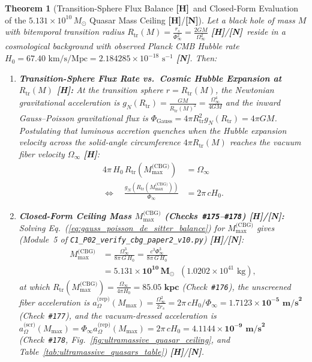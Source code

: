 \documentclass[11pt,a4paper]{article}
\newcommand{\catH}{\textbf{\textcolor{orange!85!black}{[H]}}}
\newcommand{\catN}{\textbf{\textcolor{teal!75!black}{[N]}}}
\theoremstyle{plain}
\newtheorem{theorem}{Theorem}[section]
\theoremstyle{definition}
\theoremstyle{remark}
\numberwithin{equation}{section}
\begin{document}
\begin{theorem}[Transition-Sphere Flux Balance \catH\ and Closed-Form Evaluation of the $5.131 \times 10^{10}\,M_\odot$ Quasar Mass Ceiling \catH/\catN]
\label{prop:quasar_ceiling}
Let a black hole of mass $M$ with bitemporal transition radius $R_{\text{tr}}(M) = \frac{r_s}{\Phi_{\infty}^2} = \frac{2GM}{\Omega_{\infty}^2}$ \catH/\catN\ reside in a cosmological background with observed Planck CMB Hubble rate $H_0 = 67.40\text{ km/s/Mpc} = 2.184285 \times 10^{-18}\text{ s}^{-1}$ \catN. Then:
\begin{enumerate}
  \item[\textnormal{(i)}] \textbf{Transition-Sphere Flux Rate vs.\ Cosmic Hubble Expansion at $R_{\text{tr}}(M)$ \catH:} At the transition sphere $r = R_{\text{tr}}(M)$, the Newtonian gravitational acceleration is $g_N(R_{\text{tr}}) = \frac{GM}{R_{\text{tr}}(M)^2} = \frac{\Omega_{\infty}^4}{4 G M}$ and the inward Gauss--Poisson gravitational flux is $\Phi_{\text{Gauss}} = 4\pi R_{\text{tr}}^2 g_N(R_{\text{tr}}) = 4\pi G M$. Postulating that luminous accretion quenches when the Hubble expansion velocity across the solid-angle circumference $4\pi R_{\text{tr}}(M)$ reaches the vacuum fiber velocity $\Omega_{\infty}$ \catH:
  \begin{align}
    4\pi\,H_0\,R_{\text{tr}}\!\left(M_{\max}^{\text{(CBG)}}\right) &= \Omega_{\infty} \nonumber \\[3pt]
    \Longleftrightarrow \quad \frac{g_N\!\left(R_{\text{tr}}(M_{\max}^{\text{(CBG)}})\right)}{\Phi_{\infty}} &= 2\pi\,c H_0.
    \label{eq:gauss_poisson_de_sitter_balance}
  \end{align}
  \item[\textnormal{(ii)}] \textbf{Closed-Form Ceiling Mass $M_{\max}^{\text{(CBG)}}$ (Checks~\texttt{\#175}--\texttt{\#178}) \catH/\catN:} Solving Eq.~(\ref{eq:gauss_poisson_de_sitter_balance}) for $M_{\max}^{\text{(CBG)}}$ gives (Module~5 of \allowbreak\texttt{C1\_P02\_verify\_cbg\_paper2\_v10.py}) \catH/\catN:
  \begin{align}
    M_{\max}^{\text{(CBG)}} &= \frac{\Omega_{\infty}^3}{8\pi\,G\,H_0} = \frac{c^3\Phi_{\infty}^3}{8\pi\,G\,H_0} \nonumber \\[3pt]
    &= \mathbf{5.131 \times 10^{10}\,M_\odot} \;\; \left(1.0202 \times 10^{41}\text{ kg}\right),
    \label{eq:m_max_quasar_ceiling}
  \end{align}
  at which $R_{\text{tr}}(M_{\max}^{\text{(CBG)}}) = \frac{\Omega_{\infty}}{4\pi H_0} = \mathbf{85.05\text{ kpc}}$ (Check~\texttt{\#176}), the unscreened fiber acceleration is $a_{\Omega}^{\text{(rep)}}(M_{\max}) = \frac{\Omega_{\infty}^2}{2 r_s} = 2\pi\,c H_0/\Phi_{\infty} = \mathbf{1.7123 \times 10^{-5}\text{ m/s}^2}$ (Check~\texttt{\#177}), and the vacuum-dressed acceleration is $a_{\Omega}^{\text{(scr)}}(M_{\max}) = \Phi_{\infty} a_{\Omega}^{\text{(rep)}}(M_{\max}) = 2\pi\,c H_0 = \mathbf{4.1144 \times 10^{-9}\text{ m/s}^2}$ (Check~\texttt{\#178}, Fig.~\ref{fig:ultramassive_quasar_ceiling}, and Table~\ref{tab:ultramassive_quasars_table}) \catH/\catN.
\end{enumerate}
\end{theorem}
\end{document}
